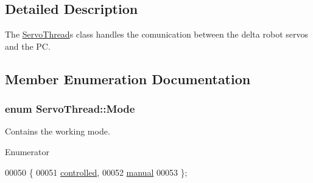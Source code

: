 \subsection{Detailed Description}
The \hyperlink{a00008}{Servo\+Thread}\textquotesingle{}s class handles the comunication between the delta robot servos and the P\+C. 



\subsection{Member Enumeration Documentation}
\hypertarget{a00008_a8d581034e60792a9995d44065f6140a5}{}
\subsubsection[{Mode}]{\setlength{\rightskip}{0pt plus 5cm}enum {\bf Servo\+Thread\+::\+Mode}}\label{a00008_a8d581034e60792a9995d44065f6140a5}


Contains the working mode. 

\begin{Desc}
\item[Enumerator]\par
\begin{description}
\item[{\em 
\hypertarget{a00008_a8d581034e60792a9995d44065f6140a5a6776147f492a4e0b0bb5ee4fdbc8d086}{}controlled\label{a00008_a8d581034e60792a9995d44065f6140a5a6776147f492a4e0b0bb5ee4fdbc8d086}
}]\item[{\em 
\hypertarget{a00008_a8d581034e60792a9995d44065f6140a5ae260aa6159d95b94851c96df939b51b3}{}manual\label{a00008_a8d581034e60792a9995d44065f6140a5ae260aa6159d95b94851c96df939b51b3}
}]\end{description}
\end{Desc}

\begin{DoxyCode}
00050     \{
00051         \hyperlink{a00008_a8d581034e60792a9995d44065f6140a5a6776147f492a4e0b0bb5ee4fdbc8d086}{controlled},
00052         \hyperlink{a00008_a8d581034e60792a9995d44065f6140a5ae260aa6159d95b94851c96df939b51b3}{manual}
00053     \};
\end{DoxyCode}
\hypertarget{a00008_aeccce0ac6a969e2ee7cbe91687e2d085}{}
